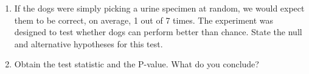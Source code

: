 \documentclass[letterpaper,9pt,twoside,printwatermark=false]{pinp}
\providecommand{\tightlist}{%
  \setlength{\itemsep}{0pt}\setlength{\parskip}{0pt}}
\begin{document}
\begin{enumerate}
\def\labelenumi{\alph{enumi}.}
\tightlist
\item
  If the dogs were simply picking a urine specimen at random, we would
  expect them to be correct, on average, 1 out of 7 times. The
  experiment was designed to test whether dogs can perform better than
  chance. State the null and alternative hypotheses for this test.
\item
  Obtain the test statistic and the P-value. What do you conclude?
\end{enumerate}





\end{document}
